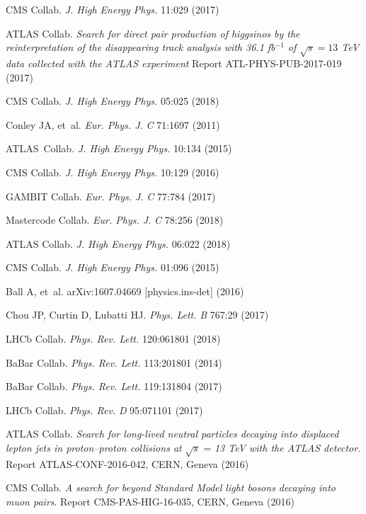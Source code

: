 \documentclass{ar-1col}
\begin{document}
{\begin{thebibliography}{175}
{CMS Collab}. \textit{J. High Energy Phys.} 11:029 (2017)

{ATLAS Collab}. \textit{Search for direct pair production of higgsinos by the reinterpretation of the disappearing track analysis with 36.1 fb$^{-1}$ of $\sqrt{s}=13$ TeV data collected with the ATLAS experiment} Report ATL-PHYS-PUB-2017-019 (2017)
               
{CMS Collab}. \textit{J. High Energy Phys.} 05:025 (2018)

Conley JA, et~al. \textit{Eur. Phys. J.} \textit{C} 71:1697 (2011)

{ATLAS~Collab.} \textit{J. High Energy Phys.} 10:134 (2015)

{CMS Collab}. \textit{J. High Energy Phys.} 10:129 (2016)

GAMBIT Collab. \textit{Eur. Phys. J.} \textit{C} 77:784 (2017)

Mastercode Collab. \textit{Eur. Phys. J.} \textit{C} 78:256 (2018)

{ATLAS Collab}. \textit{J. High Energy Phys.} 06:022 (2018)

{CMS Collab}. \textit{J. High Energy Phys.} 01:096 (2015)

Ball A, et~al. arXiv:1607.04669 [physics.ins-det] (2016)

Chou JP, Curtin D, Lubatti HJ. \textit{Phys. Lett.} \textit{B} 767:29 (2017)

{LHCb Collab}.  \textit{Phys. Rev. Lett.} 120:061801 (2018)


BaBar Collab. \textit{Phys. Rev. Lett.} 113:201801 (2014)

BaBar Collab. \textit{Phys. Rev. Lett.} 119:131804 (2017)

{LHCb Collab}. \textit{Phys. Rev.} \textit{D} 95:071101 (2017)

ATLAS Collab. \textit{Search for long-lived neutral particles decaying into displaced lepton jets in proton--proton collisions at} $\sqrt{s}$ = \textit{13 TeV with the ATLAS detector}. Report ATLAS-CONF-2016-042, CERN, Geneva (2016)

CMS Collab. \textit{A search for beyond Standard Model light bosons decaying into muon pairs}.
Report CMS-PAS-HIG-16-035, CERN, Geneva (2016)


\end{thebibliography}}
\end{document}
